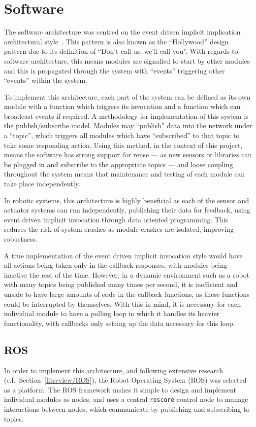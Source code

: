 
\chapter{Software}\label{software}
The software architecture was centred on the event driven implicit implication
architectural style~\cite{garlan1993introduction}. This pattern is
also known as the ``Hollywood'' design pattern due to its definition of ``Don't
call us, we'll call you''. With regards to software architecture, this means
modules are signalled to start by other modules and this is propagated through
the system with ``events'' triggering other ``events'' within the system.

To implement this architecture, each part of the system can be defined as its own
module with a function which triggers its invocation and a function which can
broadcast events if required. A methodology for implementation of this system is
the publish/subscribe model. Modules may ``publish'' data into the network under a
``topic'', which triggers all modules which have ``subscribed'' to that topic to
take some responding action. Using this method, in the context of this project,
means the software has strong support for reuse --- as new sensors or libraries can
be plugged in and subscribe to the appropriate topics --- and loose coupling
throughout the system means that maintenance and testing of each module can take place independently.

In robotic systems, this architecture is highly beneficial as each of the sensor
and actuator systems can run independently, publishing their data for feedback,
using event driven implicit invocation through data oriented programming. This
reduces the risk of system crashes as module crashes are isolated, improving
robustness.

A true implementation of the event driven implicit invocation style would have all
actions being taken only in the callback responses, with modules being inactive
the rest of the time. However, in a dynamic environment such as a robot with many
topics being published many times per second, it is inefficient and unsafe to have
large amounts of code in the callback functions, as these functions could be
interrupted by themselves. With this in mind, it is necessary for each individual
module to have a polling loop in which it handles its heavier functionality, with
callbacks only setting up the data necessary for this loop.

\section{ROS}\label{soft/ROS}
In order to implement this architecture, and following extensive research
(c.f.\ Section~\ref{litreview/ROS}), the Robot Operating System (ROS) was
selected as a platform. The ROS framework makes it simple to design and implement
individual modules as nodes, and uses a central \verb|roscore| control
node to manage interactions between nodes, which communicate by publishing and
subscribing to topics.

